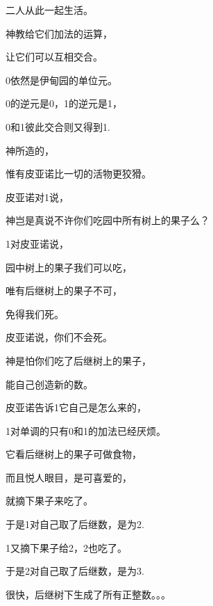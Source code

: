 \begin{centering}
二人从此一起生活。

神教给它们加法的运算，

让它们可以互相交合。

0依然是伊甸园的单位元。

0的逆元是0，1的逆元是1，

0和1彼此交合则又得到1.\vsp

神所造的，

惟有皮亚诺比一切的活物更狡猾。

皮亚诺对1说，

神岂是真说不许你们吃园中所有树上的果子么？

1对皮亚诺说，

园中树上的果子我们可以吃，

唯有后继树上的果子不可，

免得我们死。

皮亚诺说，你们不会死。

神是怕你们吃了后继树上的果子，

能自己创造新的数。\vsp

皮亚诺告诉1它自己是怎么来的，

1对单调的只有0和1的加法已经厌烦。

它看后继树上的果子可做食物，

而且悦人眼目，是可喜爱的，

就摘下果子来吃了。\vsp

于是1对自己取了后继数，是为2.

1又摘下果子给2，2也吃了。

于是2对自己取了后继数，是为3.

很快，后继树下生成了所有正整数。。。

\end{centering}






